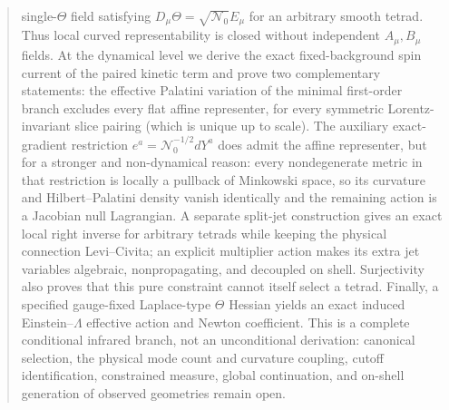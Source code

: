 \documentclass[12pt,a4paper]{article}
\theoremstyle{remark}\newtheorem{remark}[definition]{Remark}
\begin{document}
\begin{abstract}
single-$\Theta$ field satisfying
$D_\mu\Theta=\sqrt{\mathcal N_0}E_\mu$ for an arbitrary smooth tetrad.  Thus
local curved representability is closed without independent $A_\mu,B_\mu$
fields.  At the dynamical level we derive the exact fixed-background spin
current of the paired kinetic term and prove two complementary statements:
the effective Palatini variation of the minimal first-order branch excludes
every flat affine representer, for every symmetric Lorentz-invariant slice
pairing (which is unique up to scale).  The auxiliary exact-gradient
restriction $e^a=\mathcal N_0^{-1/2}dY^a$ does admit the affine representer,
but for a stronger and non-dynamical reason: every nondegenerate metric in
that restriction is locally a pullback of Minkowski space, so its curvature
and Hilbert--Palatini density vanish identically and the remaining action is
 a Jacobian null Lagrangian.  A separate split-jet construction gives an exact
local right inverse for arbitrary tetrads while keeping the physical
connection Levi--Civita; an explicit multiplier action makes its extra jet
variables algebraic, nonpropagating, and decoupled on shell.  Surjectivity also
proves that this pure constraint cannot itself select a tetrad.  Finally, a
specified gauge-fixed Laplace-type $\Theta$ Hessian yields an exact induced
Einstein--$\Lambda$ effective action and Newton coefficient.  This is a
complete conditional infrared branch, not an unconditional derivation:
canonical selection, the physical mode count and curvature coupling, cutoff
identification, constrained measure, global continuation, and on-shell
generation of observed geometries remain open.
\end{abstract}

\tableofcontents
\end{document}
